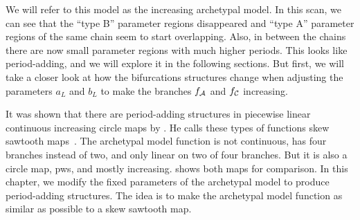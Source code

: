 We will refer to this model as the increasing archetypal model.
In this scan, we can see that the ``type B'' parameter regions disappeared and ``type A'' parameter regions of the same chain seem to start overlapping.
Also, in between the chains there are now small parameter regions with much higher periods.
This looks like period-adding, and we will explore it in the following sections.
But first, we will take a closer look at how the bifurcations structures change when adjusting the parameters $a_L$ and $b_L$ to make the branches $f_{\mathcal{A}}$ and $f_{\mathcal{C}}$ increasing.


It was shown that there are period-adding structures in piecewise linear continuous increasing circle maps by .
He calls these types of functions skew sawtooth maps~\cite{simpson2018saw}.
The archetypal model function is not continuous, has four branches instead of two, and only linear on two of four branches.
But it is also a circle map, \gls{pws}, and mostly increasing.
 shows both maps for comparison.
In this chapter, we modify the fixed parameters of the archetypal model to produce period-adding structures.
The idea is to make the archetypal model function as similar as possible to a skew sawtooth map.

